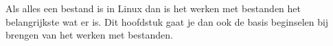 Als alles een bestand is in Linux dan is het werken met bestanden het belangrijkste wat er is. Dit hoofdstuk gaat je dan ook de basis beginselen bij brengen van het werken met bestanden.
